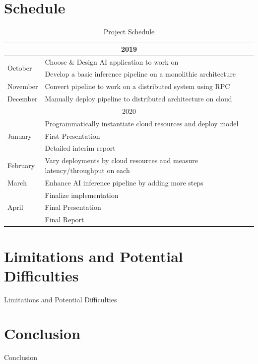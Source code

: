 \documentclass{report}
\def\backmatter{%
    \setcounter{section}{0}
    \renewcommand{\thesection}{\Alph{section}}
}%
\begin{document}
\chapter{Schedule}
\begin{table}[h!]
  \begin{center}
    \caption{Project Schedule}
    \label{tab:table1}
    \begin{tabular}{ |l|l| } 
      \hline
      \multicolumn{2}{|c|}{2019} \\ \hline
      \multirow{2}{*}{October} & Choose \& Design AI application to work on \\
       & Develop a basic inference pipeline on a monolithic architecture \\ \hline
      November & Convert pipeline to work on a distributed system using RPC \\ \hline
      December & Manually deploy pipeline to distributed architecture on cloud \\ \hline
      \multicolumn{2}{|c|}{2020} \\ \hline
      \multirow{3}{*}{January} & Programmatically instantiate cloud resources and deploy model \\
       & First Presentation \\
       & Detailed interim report \\ \hline
      February     & Vary deployments by cloud resources and measure latency/throughput on each  \\ \hline
      March     & Enhance AI inference pipeline by adding more steps  \\ \hline
      \multirow{3}{*}{April} & Finalize implementation \\
       & Final Presentation \\
       & Final Report \\ \hline
      \end{tabular}
  \end{center}
\end{table}

\chapter{Limitations and Potential Difficulties}
Limitations and Potential Difficulties

\chapter{Conclusion}
Conclusion

\backmatter

\printbibliography
\end{document}
